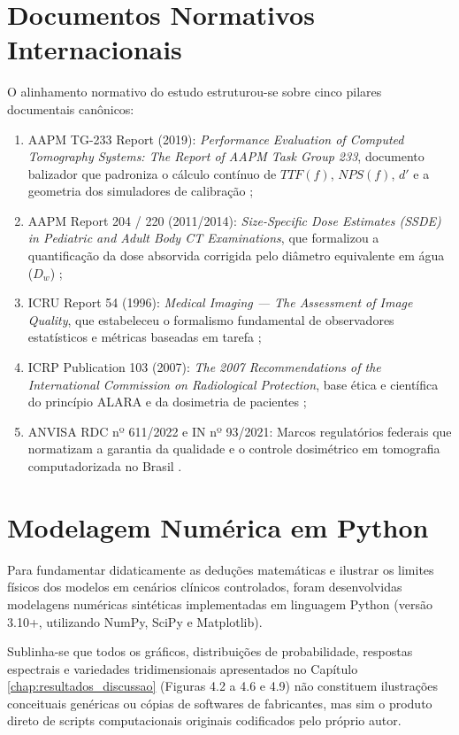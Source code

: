 \documentclass[
  12pt,
  a4paper,
  oneside
]{report}
\begin{document}
\section{Documentos Normativos Internacionais}
\label{sec:corpus_normativo_detalhe}
O alinhamento normativo do estudo estruturou-se sobre cinco pilares documentais canônicos:
\begin{enumerate}
  \item AAPM TG-233 Report (2019): \emph{Performance Evaluation of Computed Tomography Systems: The Report of AAPM Task Group 233}, documento balizador que padroniza o cálculo contínuo de $TTF(f)$, $NPS(f)$, $d'$ e a geometria dos simuladores de calibração \cite{aapm_tg233_2019};
  \item AAPM Report 204 / 220 (2011/2014): \emph{Size-Specific Dose Estimates (SSDE) in Pediatric and Adult Body CT Examinations}, que formalizou a quantificação da dose absorvida corrigida pelo diâmetro equivalente em água ($D_w$) \cite{aapm_report204};
  \item ICRU Report 54 (1996): \emph{Medical Imaging --- The Assessment of Image Quality}, que estabeleceu o formalismo fundamental de observadores estatísticos e métricas baseadas em tarefa \cite{icru54_1996};
  \item ICRP Publication 103 (2007): \emph{The 2007 Recommendations of the International Commission on Radiological Protection}, base ética e científica do princípio ALARA e da dosimetria de pacientes \cite{icrp103_2007};
  \item ANVISA RDC nº 611/2022 e IN nº 93/2021: Marcos regulatórios federais que normatizam a garantia da qualidade e o controle dosimétrico em tomografia computadorizada no Brasil \cite{anvisa_rdc611_2022, anvisa_in93_2021}.
\end{enumerate}

\section{Modelagem Numérica em Python}
\label{sec:metodologia_simulacao_python_detalhada}

Para fundamentar didaticamente as deduções matemáticas e ilustrar os limites físicos dos modelos em cenários clínicos controlados, foram desenvolvidas modelagens numéricas sintéticas implementadas em linguagem Python (versão 3.10+, utilizando NumPy, SciPy e Matplotlib). 

Sublinha-se que todos os gráficos, distribuições de probabilidade, respostas espectrais e variedades tridimensionais apresentados no Capítulo \ref{chap:resultados_discussao} (Figuras 4.2 a 4.6 e 4.9) não constituem ilustrações conceituais genéricas ou cópias de softwares de fabricantes, mas sim o produto direto de scripts computacionais originais codificados pelo próprio autor.
\end{document}
